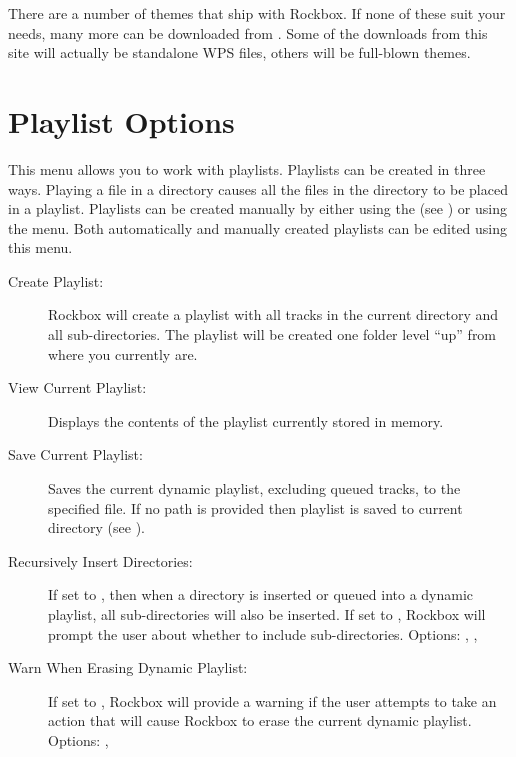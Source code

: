 There are a number of themes that ship with Rockbox. If none of
these suit your needs, many more can be downloaded from 
%
%
%
%
%
%
%
.
Some of the downloads from this site will actually be standalone WPS files, 
others will be full-blown themes. 




\section{\label{ref:playlistoptions}Playlist Options}
  This menu allows you to work with playlists. Playlists can be created in 
  three ways. Playing a file in a directory causes all the files in the 
  directory to be placed in a playlist. Playlists can be created manually by
  either using the   (see ) or using
  the  menu.  Both automatically and manually created
  playlists can be edited using this menu.

\begin{description}
\item[Create Playlist:]
  Rockbox will create a playlist with all tracks in the current directory 
and all sub-directories. The playlist will be created one folder level ``up'' 
from where you currently are.
  
\item[View Current Playlist:]
  Displays the contents of the playlist currently stored in memory.
  
\item[Save Current Playlist:]
  Saves the current dynamic playlist, excluding queued tracks, to the 
specified file. If no path is provided then playlist is saved to current 
directory (see ).
  
\item[Recursively Insert Directories: ]
  If set to , then when a directory is inserted or queued into a 
  dynamic playlist, all sub-directories will also be inserted. If set to ,
  Rockbox will prompt the user about whether to include sub-directories.
  Options: , , 

\item[Warn When Erasing Dynamic Playlist: ]
  If set to , Rockbox will provide a warning if the user attempts to
  take an action that will cause Rockbox to erase the current dynamic playlist.
  Options: , 
\end{description}

